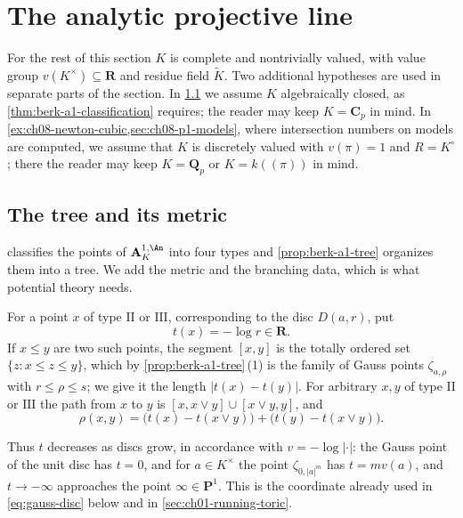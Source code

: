 \section{The analytic projective line}
\label{sec:berkovich-p1}

For the rest of this section $K$ is complete and nontrivially valued, with
value group $v(K^\times)\subseteq\mathbf R$ and residue field $\widetilde K$.
Two additional hypotheses are used in separate parts of the section.  In
\cref{sec:ch08-p1-tree} we assume $K$ algebraically closed, as
\cref{thm:berk-a1-classification} requires; the reader may keep
$K=\mathbf C_p$ in mind.  In
\cref{ex:ch08-newton-cubic,sec:ch08-p1-models}, where intersection
numbers on models are computed, we assume that $K$ is discretely
valued with $v(\pi)=1$ and $R=K^\circ$; there the reader may keep
$K=\mathbf Q_p$ or $K=k((\pi))$ in mind.

\subsection{The tree and its metric}
\label{sec:ch08-p1-tree}

 classifies the points of
$\mathbf A^{1,\An}_K$ into four types and
\cref{prop:berk-a1-tree} organizes them into a tree.  We add the metric and
the branching data, which is what potential theory needs.

\begin{definition}
\label{def:ch08-path-metric}
For a point $x$ of type $\mathrm{II}$ or $\mathrm{III}$, corresponding to
the disc $D(a,r)$, put
\[
                       t(x)=-\log r\in\mathbf R .
\]
If $x\leq y$ are two such points, the segment $[x,y]$ is the totally ordered
set $\{z:x\leq z\leq y\}$, which by \cref{prop:berk-a1-tree}\,(1) is the
family of Gauss points $\zeta_{a,\rho}$ with $r\leq\rho\leq s$; we give it the
length $|t(x)-t(y)|$.  For arbitrary $x,y$ of type
$\mathrm{II}$ or $\mathrm{III}$ the path from $x$ to $y$ is
$[x,x\vee y]\cup[x\vee y,y]$, and
\begin{equation}
\label{eq:ch08-path-metric}
 \rho(x,y)=\bigl(t(x)-t(x\vee y)\bigr)+\bigl(t(y)-t(x\vee y)\bigr) .
\end{equation}
\end{definition}

Thus $t$ decreases as discs grow, in accordance with $v=-\log|\cdot|$: the
Gauss point of the unit disc has $t=0$, and for $a\in K^\times$ the
point $\zeta_{0,|a|^m}$ has $t=m v(a)$, and $t\to-\infty$ approaches the point $\infty\in\mathbf P^1$.  This
is the coordinate already used in \eqref{eq:gauss-disc} below and in
\cref{sec:ch01-running-toric}.

